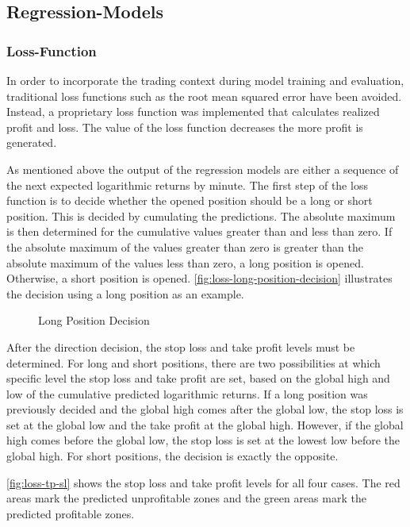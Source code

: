 \subsection{Regression-Models}

\subsubsection{Loss-Function}

In order to incorporate the trading context during model training and evaluation, traditional loss functions such as the root mean squared error have been avoided.
Instead, a proprietary loss function was implemented that calculates realized profit and loss.
The value of the loss function decreases the more profit is generated.

As mentioned above the output of the regression models are either a sequence of the next expected logarithmic returns by minute.
The first step of the loss function is to decide whether the opened position should be a long or short position.
This is decided by cumulating the predictions.
The absolute maximum is then determined for the cumulative values greater than and less than zero.
If the absolute maximum of the values greater than zero is greater than the absolute maximum of the values less than zero, a long position is opened.
Otherwise, a short position is opened.
\autoref{fig:loss-long-position-decision} illustrates the decision using a long position as an example.

\begin{figure}[H]
    \centering
    
    \caption{Long Position Decision}
    \label{fig:loss-long-position-decision}
\end{figure}

After the direction decision, the stop loss and take profit levels must be determined.
For long and short positions, there are two possibilities at which specific level the stop loss and take profit are set, based on the global high and low of the cumulative predicted logarithmic returns.
If a long position was previously decided and the global high comes after the global low, the stop loss is set at the global low and the take profit at the global high.
However, if the global high comes before the global low, the stop loss is set at the lowest low before the global high.
For short positions, the decision is exactly the opposite.

\autoref{fig:loss-tp-sl} shows the stop loss and take profit levels for all four cases.
The red areas mark the predicted unprofitable zones and the green areas mark the predicted profitable zones.

